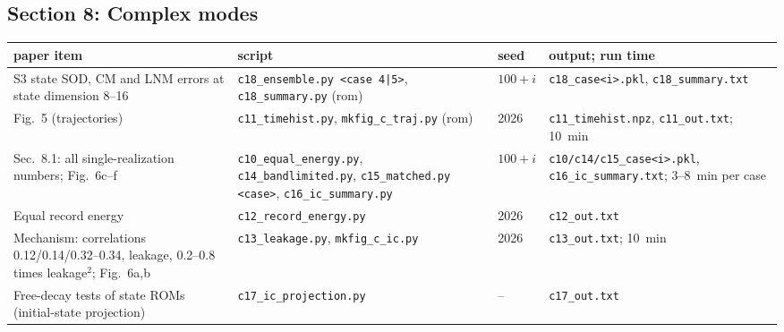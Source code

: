 \documentclass[10pt]{article}
\newcommand{\f}[1]{\texttt{#1}}
\begin{document}
\subsection*{Section 8: Complex modes}
\begin{longtable}{L{0.31\textwidth}L{0.25\textwidth}L{0.08\textwidth}L{0.25\textwidth}}
\toprule
paper item & script & seed & output; run time\\ \midrule
S3 state SOD, CM and LNM errors at state dimension 8--16 & \f{c18\_\allowbreak{}ensemble.py <case 4|5>}, \f{c18\_\allowbreak{}summary.py} (rom) & $100+i$ & \f{c18\_\allowbreak{}case<i>.pkl}, \f{c18\_\allowbreak{}summary.txt}\\
Fig.~5 (trajectories) & \f{c11\_\allowbreak{}timehist.py}, \f{mkfig\_\allowbreak{}c\_\allowbreak{}traj.py} (rom) & 2026 & \f{c11\_\allowbreak{}timehist.npz}, \f{c11\_\allowbreak{}out.txt}; 10~min\\
Sec.~8.1: all single-realization numbers; Fig.~6c--f & \f{c10\_\allowbreak{}equal\_\allowbreak{}energy.py}, \f{c14\_\allowbreak{}bandlimited.py}, \f{c15\_\allowbreak{}matched.py} \f{<case>}, \f{c16\_\allowbreak{}ic\_\allowbreak{}summary.py} & $100+i$ & \f{c10/\allowbreak{}c14/\allowbreak{}c15\_\allowbreak{}case<i>.pkl}, \f{c16\_\allowbreak{}ic\_\allowbreak{}summary.txt}; 3--8~min per case\\
Equal record energy & \f{c12\_\allowbreak{}record\_\allowbreak{}energy.py} & 2026 & \f{c12\_\allowbreak{}out.txt}\\
Mechanism: correlations 0.12/0.14/0.32--0.34, leakage, 0.2--0.8 times leakage$^2$; Fig.~6a,b & \f{c13\_\allowbreak{}leakage.py}, \f{mkfig\_\allowbreak{}c\_\allowbreak{}ic.py} & 2026 & \f{c13\_\allowbreak{}out.txt}; 10~min\\
Free-decay tests of state ROMs (initial-state projection) & \f{c17\_\allowbreak{}ic\_\allowbreak{}projection.py} & -- & \f{c17\_\allowbreak{}out.txt}\\
\bottomrule
\end{longtable}
\end{document}
